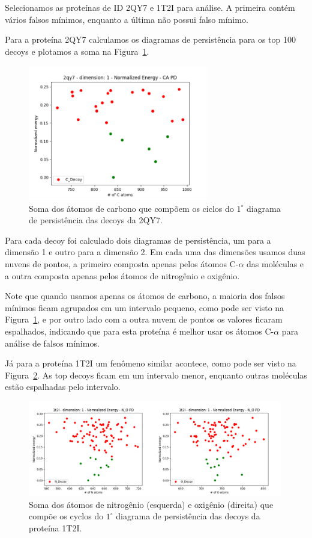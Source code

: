 Selecionamos as proteínas de ID 2QY7 e 1T2I para análise. A primeira contém vários falsos mínimos,
enquanto a última não possui falso mínimo.

Para a proteína 2QY7 calculamos os diagramas de persistência para os top 100 decoys e plotamos a
soma na Figura~\ref{fig:cyc2qy7}.

\begin{figure}[!htbp]
    \centering
    \includegraphics[width=0.7\textwidth]{images/relatorio/cyc2qy7.png}
    \caption{Soma dos átomos de carbono que compõem os ciclos do
            $1^\circ$ diagrama de persistência das decoys da 2QY7.}
    \label{fig:cyc2qy7}
    \fautor
\end{figure}

Para cada decoy foi calculado dois diagramas de persistência, um para a dimensão 1 e outro para a dimensão 2.
Em cada uma das dimensões usamos duas nuvens de pontos, a primeiro composta apenas pelos átomos C-$\alpha$
das moléculas e a outra composta apenas pelos átomos de nitrogênio e oxigênio.

Note que quando usamos apenas os átomos de carbono, a maioria dos falsos mínimos ficam agrupados em um intervalo
pequeno, como pode ser visto na Figura~\ref{fig:cyc2qy7}, e por outro lado com a outra nuvem de pontos os valores
ficaram espalhados, indicando que para esta proteína é melhor usar os átomos C-$\alpha$ para análise de falsos
mínimos.

Já para a proteína 1T2I um fenômeno similar acontece, como pode ser visto na Figura~\ref{fig:nocyc}. As top decoys
ficam em um intervalo menor, enquanto outras moléculas estão espalhadas pelo intervalo.
\begin{figure}[!htbp]
    \centering
    \includegraphics[width=0.99\textwidth]{images/relatorio/NOcyc.png}
    \caption{Soma dos átomos de nitrogênio (esquerda) e oxigênio (direita) que compõe os cyclos do 
    $1^\circ$ diagrama de persistência das decoys da proteína 1T2I.}    
    \label{fig:nocyc}
    \fautor
\end{figure}

